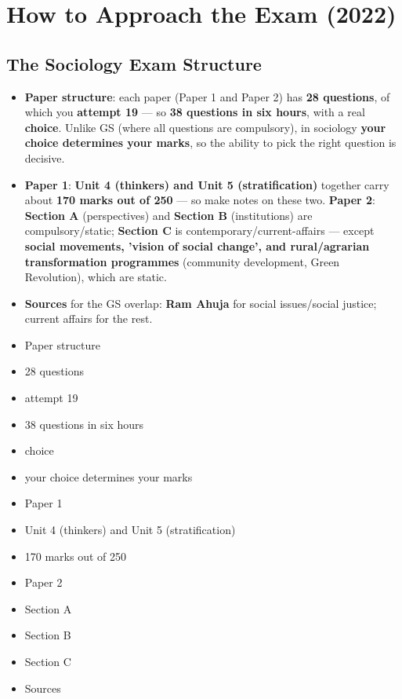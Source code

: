\chapter{How to Approach the Exam (2022)}

\section{The Sociology Exam Structure}

\begin{KeyConcept}
\begin{itemize}
\item \textbf{Paper structure}: each paper (Paper 1 and Paper 2) has \textbf{28 questions}, of which you \textbf{attempt 19} --- so \textbf{38 questions in six hours}, with a real \textbf{choice}. Unlike GS (where all questions are compulsory), in sociology \textbf{your choice determines your marks}, so the ability to pick the right question is decisive.
\item \textbf{Paper 1}: \textbf{Unit 4 (thinkers) and Unit 5 (stratification)} together carry about \textbf{170 marks out of 250} --- so make notes on these two. \textbf{Paper 2}: \textbf{Section A} (perspectives) and \textbf{Section B} (institutions) are compulsory/static; \textbf{Section C} is contemporary/current-affairs --- except \textbf{social movements, 'vision of social change', and rural/agrarian transformation programmes} (community development, Green Revolution), which are static.
\item \textbf{Sources} for the GS overlap: \textbf{Ram Ahuja} for social issues/social justice; current affairs for the rest.
\end{itemize}
\end{KeyConcept}

\begin{QuickRevision}
\begin{itemize}
\item Paper structure
\item 28 questions
\item attempt 19
\item 38 questions in six hours
\item choice
\item your choice determines your marks
\item Paper 1
\item Unit 4 (thinkers) and Unit 5 (stratification)
\item 170 marks out of 250
\item Paper 2
\item Section A
\item Section B
\item Section C
\item Sources
\end{itemize}
\end{QuickRevision}

